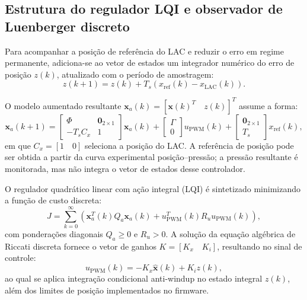 \subsection[Estrutura do regulador LQI e observador de Luenberger discreto]{Estrutura do regulador LQI e observador de Luenberger discreto}
\label{sec:sintese-lqi-luenberger-lac}

Para acompanhar a posição de referência do LAC e reduzir o erro em regime permanente, adiciona-se ao vetor de estados um integrador numérico do erro de posição $z(k)$, atualizado com o período de amostragem:
\begin{equation}
    z(k+1) = z(k) + T_s\left( x_{\mathrm{ref}}(k) - x_{\mathrm{LAC}}(k) \right).
    \label{eq:integrador_erro_lac}
\end{equation}

O modelo aumentado resultante $\mathbf{x}_a(k) = [\mathbf{x}(k)^T \quad z(k)]^T$ assume a forma:
\begin{equation}
    \mathbf{x}_a(k+1) =
    \begin{bmatrix}
        \Phi & \mathbf{0}_{2\times1} \\
        -T_s C_x & 1
    \end{bmatrix}\mathbf{x}_a(k)
    +
    \begin{bmatrix}\Gamma\\0\end{bmatrix}u_{\mathrm{PWM}}(k)
    +
    \begin{bmatrix}\mathbf{0}_{2\times1}\\T_s\end{bmatrix}x_{\mathrm{ref}}(k),
    \label{eq:planta_aumentada_lac}
\end{equation}
em que $C_x=[1\quad 0]$ seleciona a posição do LAC. A referência de posição pode ser obtida a partir da curva experimental posição--pressão; a pressão resultante é monitorada, mas não integra o vetor de estados desse controlador.

O regulador quadrático linear com ação integral (LQI) é sintetizado minimizando a função de custo discreta:
\begin{equation}
    J = \sum_{k=0}^{\infty} \left( \mathbf{x}_a^T(k) Q_a \mathbf{x}_a(k) + u_{\mathrm{PWM}}^T(k) R_u u_{\mathrm{PWM}}(k) \right),
    \label{eq:custo_lqi_lac}
\end{equation}
com ponderações diagonais $Q_a \ge 0$ e $R_u > 0$. A solução da equação algébrica de Riccati discreta fornece o vetor de ganhos $K = [K_x \quad K_i]$, resultando no sinal de controle:
\begin{equation}
    u_{\mathrm{PWM}}(k) = -K_x \hat{\mathbf{x}}(k) + K_i z(k),
    \label{eq:lei_controle_lqi_lac}
\end{equation}
ao qual se aplica integração condicional anti-windup no estado integral $z(k)$, além dos limites de posição implementados no firmware.


